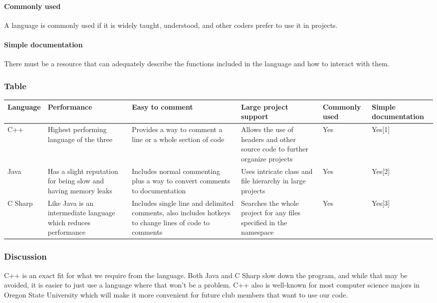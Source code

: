 \documentclass[10pt,letterpaper,onecolumn,draftclsnofoot]{IEEEtran}
\begin{document}
\paragraph{Commonly used}
A language is commonly used if it is widely taught, understood, and other coders prefer to use it in projects.

\paragraph{Simple documentation}
There must be a resource that can adequately describe the functions included in the language and how to interact with them.

\subsubsection{Table}
\begin{center}
\begin{tabular}{ ||B|M|M|M|M|M|| } 
\hline
Language & Performance & Easy to comment & Large project support & Commonly used & Simple documentation\\
 \hline
 C++ & Highest performing language of the three & Provides a way to comment a line or a whole section of code & Allows the use of headers and other source code to further organize projects & Yes & Yes[1]\\ 
 \hline
 Java & Has a slight reputation for being slow and having memory leaks & Includes normal commenting plus a way to convert comments to documentation & Uses intricate class and file hierarchy in large projects & Yes & Yes[2]\\ 
 \hline
 C Sharp & Like Java is an intermediate language which reduces performance & Includes single line and delimited comments, also includes hotkeys to change lines of code to comments & Searches the whole project for any files specified in the namespace & Yes & Yes[3]\\ 
 \hline
\end{tabular}
\end{center}

\subsubsection{Discussion}
C++ is an exact fit for what we require from the language. Both Java and C Sharp slow down the program, and while that may be avoided, it is easier to just use a language where that won't be a problem. C++ also is well-known for most computer science majors in Oregon State University which will make it more convenient for future club members that want to use our code.
\end{document}

